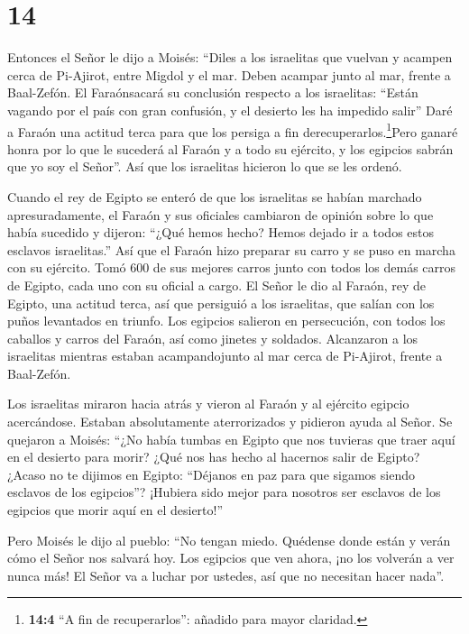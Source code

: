 \hypertarget{section-13}{%
\section{14}\label{section-13}}

 Entonces el Señor le dijo a Moisés:  ``Diles a
los israelitas que vuelvan y acampen cerca de Pi-Ajirot, entre Migdol y
el mar. Deben acampar junto al mar, frente a Baal-Zefón.  El
Faraónsacará su conclusión respecto a los israelitas: ``Están vagando
por el país con gran confusión, y el desierto les ha impedido salir''
 Daré a Faraón una actitud terca para que los persiga a fin
derecuperarlos.\footnote{\textbf{14:4} ``A fin de recuperarlos'':
  añadido para mayor claridad.}Pero ganaré honra por lo que le sucederá
al Faraón y a todo su ejército, y los egipcios sabrán que yo soy el
Señor''. Así que los israelitas hicieron lo que se les ordenó.

 Cuando el rey de Egipto se enteró de que los israelitas se
habían marchado apresuradamente, el Faraón y sus oficiales cambiaron de
opinión sobre lo que había sucedido y dijeron: ``¿Qué hemos hecho? Hemos
dejado ir a todos estos esclavos israelitas.''  Así que el
Faraón hizo preparar su carro y se puso en marcha con su ejército.
 Tomó 600 de sus mejores carros junto con todos los demás
carros de Egipto, cada uno con su oficial a cargo.  El Señor
le dio al Faraón, rey de Egipto, una actitud terca, así que persiguió a
los israelitas, que salían con los puños levantados en triunfo.
 Los egipcios salieron en persecución, con todos los
caballos y carros del Faraón, así como jinetes y soldados. Alcanzaron a
los israelitas mientras estaban acampandojunto al mar cerca de
Pi-Ajirot, frente a Baal-Zefón.

 Los israelitas miraron hacia atrás y vieron al Faraón y al
ejército egipcio acercándose. Estaban absolutamente aterrorizados y
pidieron ayuda al Señor.  Se quejaron a Moisés: ``¿No había
tumbas en Egipto que nos tuvieras que traer aquí en el desierto para
morir? ¿Qué nos has hecho al hacernos salir de Egipto? 
¿Acaso no te dijimos en Egipto: ``Déjanos en paz para que sigamos siendo
esclavos de los egipcios''? ¡Hubiera sido mejor para nosotros ser
esclavos de los egipcios que morir aquí en el desierto!''

 Pero Moisés le dijo al pueblo: ``No tengan miedo. Quédense
donde están y verán cómo el Señor nos salvará hoy. Los egipcios que ven
ahora, ¡no los volverán a ver nunca más!  El Señor va a
luchar por ustedes, así que no necesitan hacer nada''.

